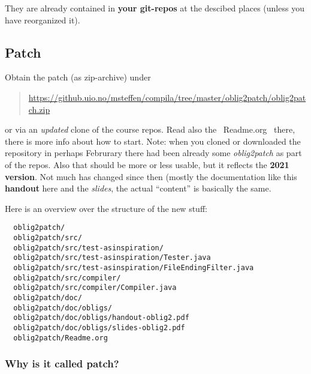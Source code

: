 \documentclass[11pt,freeform]{handout}[2014/08/13]
\begin{document}
They are already contained in \textbf{your git-repos} at the descibed
places (unless you have reorganized it).

\subsection*{Patch}
\label{sec:patch}


Obtain the patch (as zip-archive) under 

\begin{quote}
  \url{https://github.uio.no/msteffen/compila/tree/master/oblig2patch/oblig2patch.zip}
\end{quote}

or via an \emph{updated} clone of the course repos. Read also the
~Readme.org~ there, there is more info about how to start. Note: when you
cloned or downloaded the repository in perhaps Februrary there had been
already some \emph{oblig2patch} as part of the repos. Also that should be
more or less usable, but it reflects the \textbf{2021 version}. Not much
has changed since then (mostly the documentation like this \textbf{handout}
here and the \emph{slides}, the actual ``content'' is basically the same.

Here is an overview over the structure of the new stuff:


\begin{verbatim}
  oblig2patch/
  oblig2patch/src/
  oblig2patch/src/test-asinspiration/
  oblig2patch/src/test-asinspiration/Tester.java
  oblig2patch/src/test-asinspiration/FileEndingFilter.java
  oblig2patch/src/compiler/
  oblig2patch/src/compiler/Compiler.java
  oblig2patch/doc/
  oblig2patch/doc/obligs/
  oblig2patch/doc/obligs/handout-oblig2.pdf
  oblig2patch/doc/obligs/slides-oblig2.pdf
  oblig2patch/Readme.org
\end{verbatim}


\subsubsection{Why is it called patch?}
\label{sec:why-it-called}
\end{document}
